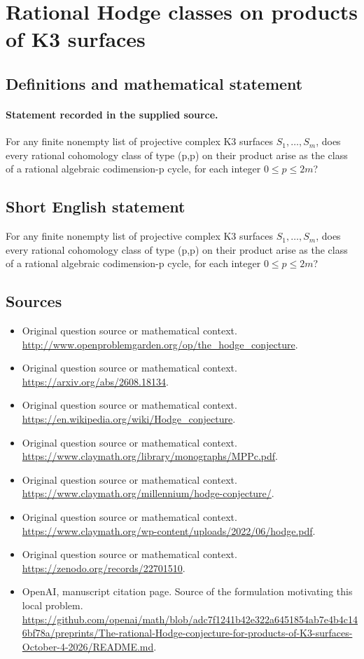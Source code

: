 \documentclass[11pt]{article}
\begin{document}
\section*{Rational Hodge classes on products of K3 surfaces}\label{30007037}
\subsection{Definitions and mathematical statement}
\paragraph{Statement recorded in the supplied source.}
For any finite nonempty list of projective complex K3 surfaces $S_{1},\dots ,S_m$, does every rational cohomology class of type (p,p) on their product arise as the class of a rational algebraic codimension-p cycle, for each integer $0\leq p\leq 2m$?
\subsection{Short English statement}
For any finite nonempty list of projective complex K3 surfaces $S_{1},\dots ,S_m$, does every rational cohomology class of type (p,p) on their product arise as the class of a rational algebraic codimension-p cycle, for each integer $0\leq p\leq 2m$?
\subsection{Sources}
\begin{itemize}
\item[S1] Original question source or mathematical context.
\url{http://www.openproblemgarden.org/op/the_hodge_conjecture}.
\item[S2] Original question source or mathematical context.
\url{https://arxiv.org/abs/2608.18134}.
\item[S3] Original question source or mathematical context.
\url{https://en.wikipedia.org/wiki/Hodge_conjecture}.
\item[S4] Original question source or mathematical context.
\url{https://www.claymath.org/library/monographs/MPPc.pdf}.
\item[S5] Original question source or mathematical context.
\url{https://www.claymath.org/millennium/hodge-conjecture/}.
\item[S6] Original question source or mathematical context.
\url{https://www.claymath.org/wp-content/uploads/2022/06/hodge.pdf}.
\item[S7] Original question source or mathematical context.
\url{https://zenodo.org/records/22701510}.
\item[S8] OpenAI, manuscript citation page. Source of the formulation motivating this local problem.
\url{https://github.com/openai/math/blob/adc7f1241b42e322a6451854ab7e4b4c146bf78a/preprints/The-rational-Hodge-conjecture-for-products-of-K3-surfaces-October-4-2026/README.md}.
\end{itemize}
\end{document}
